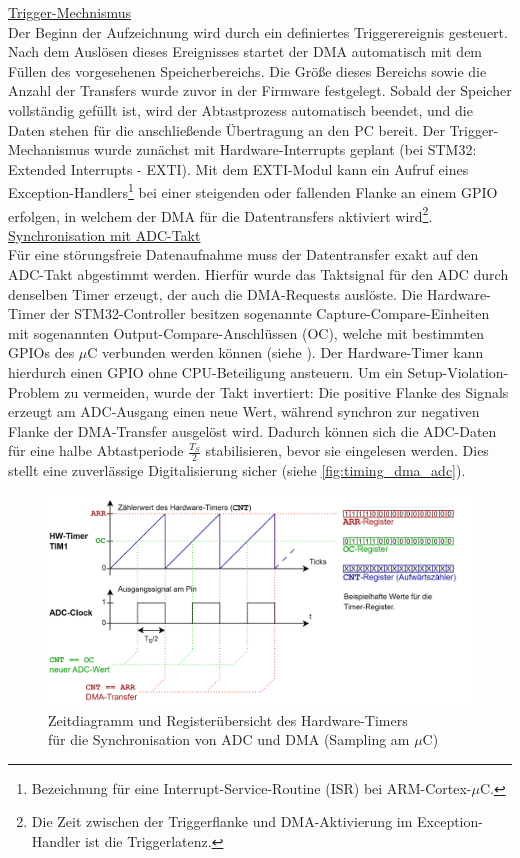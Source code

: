 \documentclass[a4paper, portrait, 12pt]{scrartcl} %
\begin{document}
\underline{Trigger-Mechnismus}\\
Der Beginn der Aufzeichnung wird durch ein definiertes Triggerereignis gesteuert. Nach dem Auslösen dieses Ereignisses startet der DMA automatisch mit dem Füllen des vorgesehenen Speicherbereichs. Die Größe dieses Bereichs sowie die Anzahl der Transfers wurde zuvor in der Firmware festgelegt. Sobald der Speicher vollständig gefüllt ist, wird der Abtastprozess automatisch beendet, und die Daten stehen für die anschließende Übertragung an den PC bereit. Der Trigger-Mechanismus wurde zunächst mit Hardware-Interrupts geplant (bei STM32: Extended Interrupts - EXTI). Mit dem EXTI-Modul kann ein Aufruf eines Exception-Handlers\footnote{Bezeichnung für eine Interrupt-Service-Routine (ISR) bei ARM-Cortex-$\mu$C.} bei einer steigenden oder fallenden Flanke an einem GPIO erfolgen, in welchem der DMA für die Datentransfers aktiviert wird\footnote{Die Zeit zwischen der Triggerflanke und DMA-Aktivierung im Exception-Handler ist die Triggerlatenz.}.\\

\underline{Synchronisation mit ADC-Takt}\\
Für eine störungsfreie Datenaufnahme muss der Datentransfer exakt auf den ADC-Takt abgestimmt werden. Hierfür wurde das Taktsignal für den ADC durch denselben Timer erzeugt, der auch die DMA-Requests auslöste. Die Hardware-Timer der STM32-Controller besitzen sogenannte Capture-Compare-Einheiten mit sogenannten Output-Compare-Anschlüssen (OC), welche mit bestimmten GPIOs des $\mu$C verbunden werden können (siehe \cite[S. 877]{STmicroelectronics2024}). Der Hardware-Timer kann hierdurch einen GPIO ohne CPU-Beteiligung ansteuern. Um ein Setup-Violation-Problem zu vermeiden, wurde der Takt invertiert: Die positive Flanke des Signals erzeugt am ADC-Ausgang einen neue Wert, während synchron zur negativen Flanke der DMA-Transfer ausgelöst wird. Dadurch können sich die ADC-Daten für eine halbe Abtastperiode $\frac{T_S}{2}$ stabilisieren, bevor sie eingelesen werden. Dies stellt eine zuverlässige Digitalisierung sicher (siehe \autoref{fig:timing_dma_adc}).

\begin{figure}[H]
	\centering
    \includegraphics[scale=0.15]{Timing_Diagramm_Timer_ADC_DMA.png} 
	\caption{\centering Zeitdiagramm und Registerübersicht des Hardware-Timers\\für die Synchronisation von ADC und DMA (Sampling am $\mu$C)}
	\label{fig:timing_dma_adc}
\end{figure}
\end{document}
